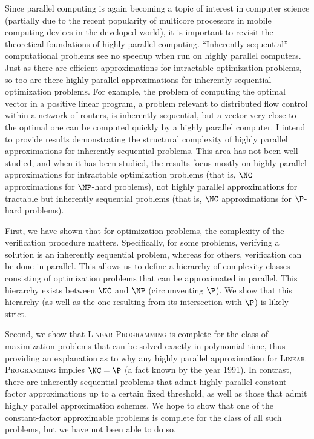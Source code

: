 \documentclass{article}
\begin{document}
Since parallel computing is again becoming a topic of interest in computer science (partially due to the recent popularity of multicore processors in mobile computing devices in the developed world), it is important to revisit the theoretical foundations of highly parallel computing.
``Inherently sequential'' computational problems see no speedup when run on highly parallel computers.
Just as there are efficient approximations for intractable optimization problems, so too are there highly parallel approximations for inherently sequential optimization problems.
For example, the problem of computing the optimal vector in a positive linear program, a problem relevant to distributed flow control within a network of routers, is inherently sequential, but a vector very close to the optimal one can be computed quickly by a highly parallel computer.
I intend to provide results demonstrating the structural complexity of highly parallel approximations for inherently sequential problems.
This area has not been well-studied, and when it has been studied, the results focus mostly on highly parallel approximations for intractable optimization problems (that is, $\NC$ approximations for $\NP$-hard problems), not highly parallel approximations for tractable but inherently sequential problems (that is, $\NC$ approximations for $\P$-hard problems).


First, we have shown that for optimization problems, the complexity of the verification procedure matters.
Specifically, for some problems, verifying a solution is an inherently sequential problem, whereas for others, verification can be done in parallel.
This allows us to define a hierarchy of complexity classes consisting of optimization problems that can be approximated in parallel.
This hierarchy exists between $\NC$ and $\NP$ (circumventing $\P$).
We show that this hierarchy (as well as the one resulting from its intersection with $\P$) is likely strict.

Second, we show that \textsc{Linear Programming} is complete for the class of maximization problems that can be solved exactly in polynomial time, thus providing an explanation as to why any highly parallel approximation for \textsc{Linear Programming} implies $\NC = \P$ (a fact known by the year 1991).
In contrast, there are inherently sequential problems that admit highly parallel constant-factor approximations up to a certain fixed threshold, as well as those that admit highly parallel approximation schemes.
We hope to show that one of the constant-factor approximable problems is complete for the class of all such problems, but we have not been able to do so.
\end{document}

